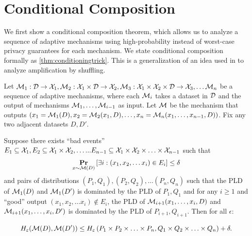 \section{Conditional Composition}\label{sec:conditioningtrick}

We first show a conditional composition theorem, which allows us to analyze a sequence of adaptive mechanisms using high-probability instead of worst-case privacy guarantees for each mechanism. We state conditional composition formally as \cref{thm:conditioningtrick}. This is a generalization of an idea used in \cite{LocalToCentral,balle2020privacy} to analyze amplification by shuffling.

\begin{theorem}\label{thm:conditioningtrick}
Let $\mathcal{M}_1: \mathcal{D} \rightarrow \mathcal{X}_1, \mathcal{M}_2: \mathcal{X}_1 \times \mathcal{D} \rightarrow \mathcal{X}_2, \mathcal{M}_3: \mathcal{X}_1 \times \mathcal{X}_2 \times \mathcal{D} \rightarrow \mathcal{X}_3, \ldots \mathcal{M}_n$ be a sequence of adaptive mechanisms, where each $\mathcal{M}_i$ takes a dataset in $\mathcal{D}$ and the output of mechanisms $\mathcal{M}_1, \ldots, \mathcal{M}_{i-1}$ as input. Let $\mathcal{M}$ be the mechanism that outputs $(x_1 = \mathcal{M}_1(D), x_2 = \mathcal{M}_2(x_1, D), \ldots, x_n = \mathcal{M}_n(x_1, \ldots, x_{n-1}, D))$. Fix any two adjacent datasets $D, D'$. 

Suppose there exists ``bad events'' $E_1 \subseteq \mathcal{X}_1, E_2 \subseteq \mathcal{X}_1 \times \mathcal{X}_2, \ldots... E_{n-1} \subseteq \mathcal{X}_1 \times \mathcal{X}_2 \times \ldots \times \mathcal{X}_{n-1}$ such that \[\mathop{\mathbf{Pr}}_{x \sim \mathcal{M}(D)}\left[\exists i: (x_1, x_2, \ldots x_i) \in E_i\right] \leq \delta\] and pairs of distributions $(P_1, Q_1), (P_2, Q_2), \ldots (P_n, Q_n)$ such that the PLD of $\mathcal{M}_1(D)$ and $\mathcal{M}_1(D')$ is dominated by the PLD of $P_1, Q_1$ and for any $i \geq 1$ and ``good'' output $(x_1, x_2, \ldots x_i) \notin E_i$, the PLD of $\mathcal{M}_{i+1}(x_1, \ldots, x_i, D)$ and $\mathcal{M}_{i+1}(x_1, \ldots, x_i, D')$ is dominated by the PLD of $P_{i+1}, Q_{i+1}$. Then for all $\epsilon$:

\[H_\varepsilon(\mathcal{M}(D), \mathcal{M}(D')) \leq H_\varepsilon\left(P_1 \times P_2 \times \ldots \times P_n, Q_1 \times Q_2 \times \ldots \times Q_n\right) + \delta.\]
\end{theorem}
